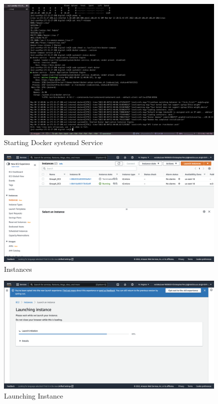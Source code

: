 \begin{figure}[H]
    \centering
        \includegraphics[width=\textwidth]{resources/installing-docker-4.png}
    \caption{Starting Docker systemd Service}
    \label{fig:installing-docker-4}
\end{figure}

\begin{figure}[H]
    \centering
        \includegraphics[width=\textwidth]{resources/instances.png}
    \caption{Instances}
    \label{fig:instances}
\end{figure}

\begin{figure}[H]
    \centering
        \includegraphics[width=\textwidth]{resources/launching-instance.png}
    \caption{Launching Instance}
    \label{fig:launching-instance}
\end{figure}

